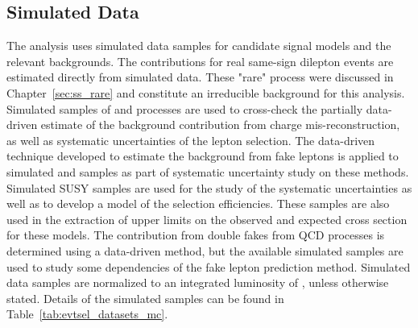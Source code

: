 \subsection{Simulated Data}
\label{sec:evtsel_samples_mc}
The analysis uses simulated data samples for candidate signal models and the
relevant backgrounds. The contributions for real same-sign dilepton events are
estimated directly from simulated data. These "rare" process were discussed
in Chapter~\ref{sec:ss_rare} and constitute an irreducible background for
this analysis. Simulated samples of \Zgs and \ttbar processes are used to
cross-check the partially data-driven estimate of the background contribution
from charge mis-reconstruction, as well as systematic uncertainties of the
lepton selection. The data-driven technique developed to estimate the background
from fake leptons is applied to simulated \ttbar and \Wj samples as part of
systematic uncertainty study on these methods. Simulated SUSY samples are used
for the study of the systematic uncertainties as well as to develop a model
of the selection efficiencies. These samples are also used in the extraction
of upper limits on the observed and expected cross section for these models.
The contribution from double fakes from QCD processes is determined using a
data-driven method, but the available simulated samples are used to study some
dependencies of the fake lepton prediction method. Simulated data samples are
normalized to an integrated luminosity of \usedLumi, unless otherwise stated.
Details of the simulated samples can be found in Table~\ref{tab:evtsel_datasets_mc}.

